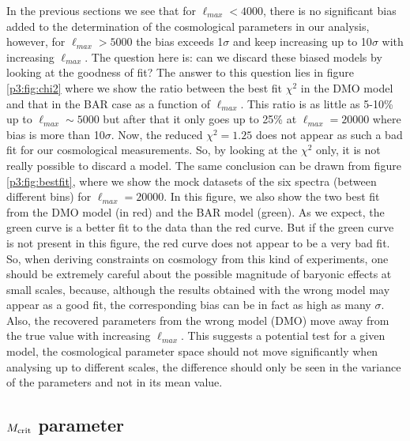 \documentclass[
  11pt,
  twoside,
  openright,
  titlepage,
  headings=optiontoheadandtoc
]{scrbook}
\begin{document}
In the previous sections we see that for $\ell_{max}<4000$, there is no significant bias added to the determination of the cosmological parameters in our analysis, however, for $\ell_{max}>5000$ the bias exceeds 1$\sigma$ and keep increasing up to 10$\sigma$ with increasing $\ell_{max}$. The question here is: can we discard these biased models by looking at the goodness of fit? The answer to this question lies in figure \ref{p3:fig:chi2} where we show the ratio between the best fit $\chi^2$ in the DMO model and that in the BAR case as a function of $\ell_{max}$. This ratio is as little as 5-10\% up to $\ell_{max} \sim 5000$ but after that it only goes up to 25\% at $\ell_{max}=20000$ where bias is more than 10$\sigma$. Now, the reduced $\chi^2=1.25$ does not appear as such a bad fit for our cosmological measurements. So, by looking at the $\chi^2$ only, it is not really possible to discard a model. The same conclusion can be drawn from figure \ref{p3:fig:bestfit}, where we show the mock datasets of the six spectra (between different bins) for $\ell_{max}=20000$. In this figure, we also show the two best fit from the DMO model (in red) and the BAR model (green). As we expect, the green curve is a better fit to the data than the red curve. But if the green curve is not present in this figure, the red curve does not appear to be a very bad fit. So, when deriving constraints on cosmology from this kind of experiments, one should be extremely careful about the possible magnitude of baryonic effects at small scales, because, although the results obtained with the wrong model may appear as a good fit, the corresponding bias can be in fact as high as many $\sigma$. Also, the recovered parameters from the wrong model (DMO) move away from the true value with increasing $\ell_{max}$. This suggests a potential test for a given model, the cosmological parameter space should not move significantly when analysing up to different scales, the difference should only be seen in the variance of the parameters and not in its mean value.


\subsection{\texorpdfstring{$M_{\rm crit}$}{Mcrit} parameter}
\end{document}
